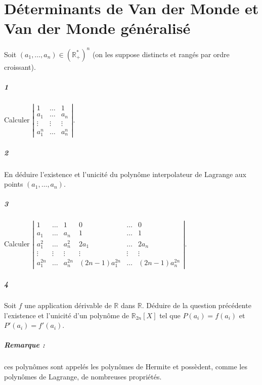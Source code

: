 \documentclass[10pt,a4paper]{article}
\begin{document}
\section{Déterminants de Van der Monde et Van der Monde généralisé}
Soit $(a_1,\dots,a_n) \in \left(\mathbb{R}_+^*\right)^n$ (on les suppose distincts et rangés par ordre croissant).
\subparagraph{1}Calculer $\left| \begin{matrix} 1 & \dots & 1 \\ a_1 & \dots & a_n \\ \vdots & \vdots & \vdots \\ a_1^n & \dots & a_n^n \end{matrix} \right|$.
\subparagraph{2}En déduire l'existence et l'unicité du polynôme interpolateur de Lagrange aux points $(a_1,\dots,a_n)$.

\subparagraph{3}Calculer $\left| \begin{matrix} 1 & \dots & 1 & 0 & \dots & 0 \\ a_1 & \dots & a_n & 1 & \dots & 1 \\ a_1^2 & \dots & a_n^2 & 2a_1 & \dots & 2a_n \\ \vdots & \vdots & \vdots & \vdots & \vdots & \vdots \\ a_1^{2n} & \dots & a_n^{2n} & (2n-1)a_1^{2n} & \dots & (2n-1)a_n^{2n} \end{matrix} \right|$.
\subparagraph{4}Soit $f$ une application dérivable de $\mathbb{R}$ dans $\mathbb{R}$. Déduire de la question précédente l'existence et l'unicité d'un polynôme de $\mathbb{R}_{2n}[X]$ tel que $P(a_i)=f(a_i)$ et $P'(a_i)=f'(a_i)$.
\subparagraph{Remarque :} ces polynômes sont appelés les polynômes de Hermite et possèdent, comme les polynômes de Lagrange, de nombreuses propriétés.
\end{document}
